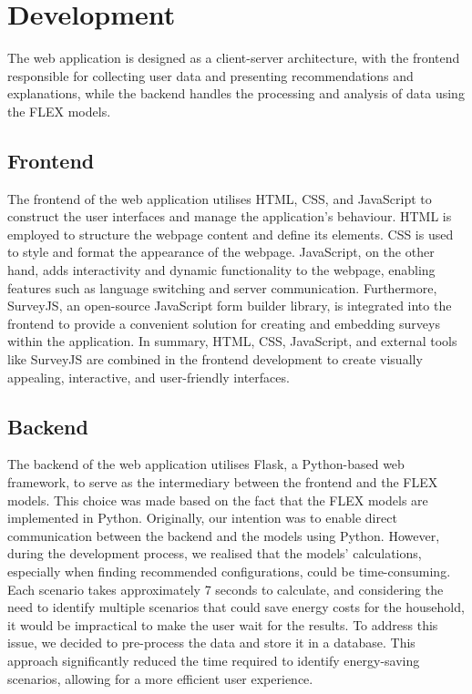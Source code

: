 \chapter{Development} 

The web application is designed as a client-server architecture, 
with the frontend responsible for collecting user data and presenting recommendations and explanations, 
while the backend handles the processing and analysis of data using the FLEX models.


\section{Frontend}

The frontend of the web application utilises HTML, CSS, and JavaScript to construct the user interfaces and manage the application's behaviour. 
HTML is employed to structure the webpage content and define its elements. 
CSS is used to style and format the appearance of the webpage. 
JavaScript, on the other hand, adds interactivity and dynamic functionality to the webpage, enabling features such as language switching and server communication. 
Furthermore, SurveyJS, an open-source JavaScript form builder library, is integrated into the frontend to provide a convenient solution for creating and embedding surveys within the application. 
In summary, HTML, CSS, JavaScript, and external tools like SurveyJS are combined in the frontend development to create visually appealing, interactive, and user-friendly interfaces. 


\section{Backend}

The backend of the web application utilises Flask, a Python-based web framework, to serve as the intermediary between the frontend and the FLEX models. 
This choice was made based on the fact that the FLEX models are implemented in Python. 
Originally, our intention was to enable direct communication between the backend and the models using Python. 
However, during the development process, we realised that the models' calculations, especially when finding recommended configurations, could be time-consuming. 
Each scenario takes approximately 7 seconds to calculate, and considering the need to identify multiple scenarios that could save energy costs for the household, 
it would be impractical to make the user wait for the results. 
To address this issue, we decided to pre-process the data and store it in a database. 
This approach significantly reduced the time required to identify energy-saving scenarios, allowing for a more efficient user experience.